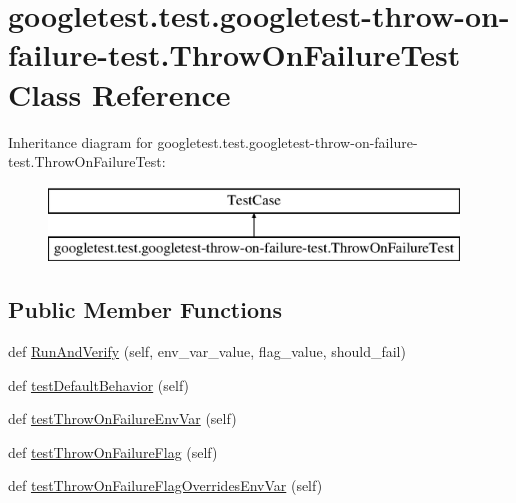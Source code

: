 \hypertarget{classgoogletest_1_1test_1_1googletest-throw-on-failure-test_1_1_throw_on_failure_test}{}\section{googletest.\+test.\+googletest-\/throw-\/on-\/failure-\/test.Throw\+On\+Failure\+Test Class Reference}
\label{classgoogletest_1_1test_1_1googletest-throw-on-failure-test_1_1_throw_on_failure_test}
Inheritance diagram for googletest.\+test.\+googletest-\/throw-\/on-\/failure-\/test.Throw\+On\+Failure\+Test\+:\begin{figure}[H]
\begin{center}
\leavevmode
\includegraphics[height=2.000000cm]{d0/d7a/classgoogletest_1_1test_1_1googletest-throw-on-failure-test_1_1_throw_on_failure_test}
\end{center}
\end{figure}
\subsection*{Public Member Functions}
\begin{DoxyCompactItemize}
\item 
def \mbox{\hyperlink{classgoogletest_1_1test_1_1googletest-throw-on-failure-test_1_1_throw_on_failure_test_aa74f30ed4b93365fe663d07c3bea0786}{Run\+And\+Verify}} (self, env\+\_\+var\+\_\+value, flag\+\_\+value, should\+\_\+fail)
\item 
def \mbox{\hyperlink{classgoogletest_1_1test_1_1googletest-throw-on-failure-test_1_1_throw_on_failure_test_a7a2e2dc9b398f2f8f717deb6ae2ecd91}{test\+Default\+Behavior}} (self)
\item 
def \mbox{\hyperlink{classgoogletest_1_1test_1_1googletest-throw-on-failure-test_1_1_throw_on_failure_test_afa50f63ebc63838e1f5142138885759d}{test\+Throw\+On\+Failure\+Env\+Var}} (self)
\item 
def \mbox{\hyperlink{classgoogletest_1_1test_1_1googletest-throw-on-failure-test_1_1_throw_on_failure_test_aa2081ed79bba744fa742927db9c3f4c9}{test\+Throw\+On\+Failure\+Flag}} (self)
\item 
def \mbox{\hyperlink{classgoogletest_1_1test_1_1googletest-throw-on-failure-test_1_1_throw_on_failure_test_a84782c0236e19c48f37c08adb272f53a}{test\+Throw\+On\+Failure\+Flag\+Overrides\+Env\+Var}} (self)
\end{DoxyCompactItemize}


